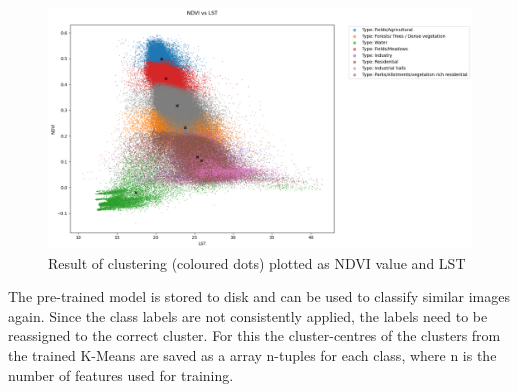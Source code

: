 \documentclass[12pt,a4paper, english]{article}
\begin{document}
        \begin{figure}[!htbp]
          \centering
          \includegraphics[width=\textwidth]{img/NDVI vs LST.png}
          \caption{Result of clustering (coloured dots) plotted as \gls{NDVI} value and \gls{LST}\label{fig:kmeansclusters}}
        \end{figure}

    The pre-trained model is stored to disk and can be used to classify similar images again. 
    Since the class labels are not consistently applied, the labels need to be reassigned to the correct cluster.
    For this the cluster-centres of the clusters from the trained K-Means are saved as a array n-tuples for each class, where n is the number of features used for training.
    \newpage
\end{document}
